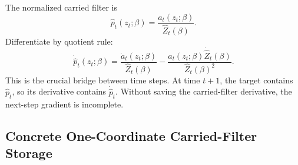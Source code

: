 \documentclass[11pt]{article}
\begin{document}
The normalized carried filter is
\[
    \widehat p_t(z_t;\beta)
    =
    \frac{a_t(z_t;\beta)}{\widehat Z_t(\beta)}.
    \tag{P19-75}
\]
Differentiate by quotient rule:
\[
    \dot{\widehat p}_t(z_t;\beta)
    =
    \frac{\dot a_t(z_t;\beta)}{\widehat Z_t(\beta)}
    -
    \frac{a_t(z_t;\beta)\dot{\widehat Z}_t(\beta)}
    {\widehat Z_t(\beta)^2}.
    \tag{P19-76}
\]
This is the crucial bridge between time steps.  At time \(t+1\), the target
contains \(\widehat p_t\), so its derivative contains
\(\dot{\widehat p}_t\).  Without saving the carried-filter derivative, the
next-step gradient is incomplete.

\subsection{Concrete One-Coordinate Carried-Filter Storage}
\end{document}
